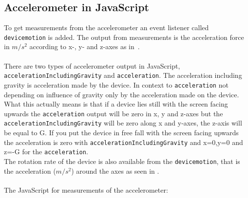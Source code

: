 \subsection{Accelerometer in JavaScript}\label{subsec:accJS}
To get measurements from the accelerometer an event listener called\\\texttt{devicemotion} is added. The output from measurements is the acceleration force in $m/s^2$ according to x-, y- and z-axes as in~. \\
\\
There are two types of accelerometer output in JavaScript,\\ \texttt{accelerationIncludingGravity} and \texttt{acceleration}. The acceleration including gravity is acceleration made by the device. In context to \texttt{acceleration} not depending on influence of gravity only by the acceleration made on the device. What this actually means is that if a device lies still with the screen facing upwards the \texttt{acceleration} output will be zero in x, y and z-axes but the \texttt{accelerationIncludingGravity} will be zero along x and y-axes, the z-axis will be equal to G. If you put the device in free fall with the screen facing upwards the acceleration is zero with \texttt{accelerationIncludingGravity} and x=0,y=0 and z=-G for the \texttt{acceleration}. \cite[]{sensor:W3Cspec} \\
The rotation rate of the device is also available from the \texttt{devicemotion}, that is the acceleration ($m/s^2$) around the axes as seen in . \\
\\
The JavaScript for measurements of the accelerometer:

\cite[]{sensor:W3C}


